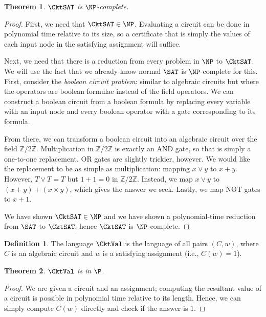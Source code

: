 \documentclass[english,12pt]{reedthesis}
\theoremstyle{plain}
\newtheorem{thm}{Theorem}[section]
\theoremstyle{definition}
\newtheorem{defn}[defn]{Definition}
\theoremstyle{remark}
\begin{document}
\begin{thm}\label{thm:cktsat-np-complete}
  $\CktSAT$ is $\NP$-complete.
\end{thm}

\begin{proof}
  First, we need that $\CktSAT \in \NP$. Evaluating a circuit can be done in
  polynomial time relative to its size, so a certificate that is simply the
  values of each input node in the satisfying assignment will suffice.

  Next, we need that there is a reduction from every problem in $\NP$ to
  $\CktSAT$. We will use the fact that we already know normal $\SAT$ is
  $\NP$-complete for this. First, consider the \emph{boolean circuit problem}:
  similar to algebraic circuits but where the operators are boolean formulae
  instead of the field operators. We can construct a boolean circuit from a
  boolean formula by replacing every variable with an input node and every
  boolean operator with a gate corresponding to its formula.

  From there, we can transform a boolean circuit into an algebraic circuit over
  the field $\mathbb{Z}/2\mathbb{Z}$. Multiplication in $\mathbb{Z}/2\mathbb{Z}$ is exactly an AND gate, so that is
  simply a one-to-one replacement. OR gates are slightly trickier, however. We
  would like the replacement to be as simple as multiplication: mapping $x \vee y$
  to $x + y$. However, $T \vee T = T$ but $1 + 1 = 0$ in $\mathbb{Z}/2\mathbb{Z}$. Instead, we map
  $x \vee y$ to $(x + y) + (x \times y)$, which gives the answer we seek. Lastly, we map
  NOT gates to $x + 1$.

  We have shown $\CktSAT \in \NP$ and we have shown a polynomial-time reduction
  from $\SAT$ to $\CktSAT$; hence $\CktSAT$ is $\NP$-complete.
\end{proof}

\begin{defn}\label{def:cktval}
  The language $\CktVal$ is the language of all pairs $(C, w)$, where $C$ is an
  algebraic circuit and $w$ is a satisfying assignment (i.e., $C(w) = 1$).
\end{defn}

\begin{thm}\label{thm:cktval-in-p}
  $\CktVal$ is in $\P$.
\end{thm}

\begin{proof}
  We are given a circuit and an assignment; computing the resultant value of a
  circuit is possible in polynomial time relative to its length. Hence, we can
  simply compute $C(w)$ directly and check if the answer is $1$.
\end{proof}
\end{document}

